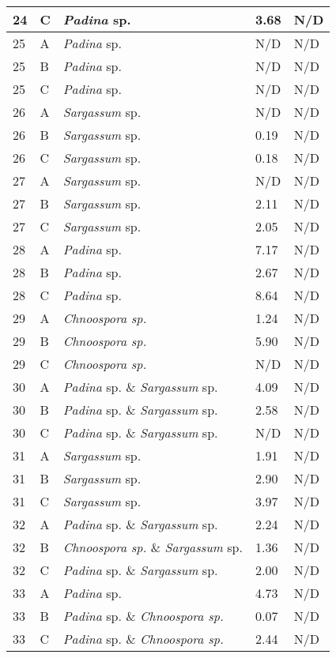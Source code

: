 \documentclass[12pt]{article}
\begin{document}
\begin{longtable}{ | p{1cm} | p{1cm} | p{3cm} | p{4cm} | p{4cm} | }
\hline
24&C&\emph{Padina} sp.&3.68
&N/D\\
\hline
25&A&\emph{Padina} sp.&N/D&N/D\\
\hline
25&B&\emph{Padina} sp.&N/D&N/D\\
\hline
25&C&\emph{Padina} sp.&N/D&N/D\\
\hline
26&A&\emph{Sargassum} sp.&N/D&N/D\\
\hline
26&B&\emph{Sargassum} sp.&0.19
&N/D\\
\hline
26&C&\emph{Sargassum} sp.&0.18
&N/D\\
\hline
27&A&\emph{Sargassum} sp.&N/D&N/D\\
\hline
27&B&\emph{Sargassum} sp.&2.11
&N/D\\
\hline
27&C&\emph{Sargassum} sp.&2.05
&N/D\\
\hline
28&A&\emph{Padina} sp.&7.17
&N/D\\
\hline
28&B&\emph{Padina} sp.&2.67
&N/D\\
\hline
28&C&\emph{Padina} sp.&8.64
&N/D\\
\hline
29&A&\emph{Chnoospora sp.}&1.24
&N/D\\
\hline
29&B&\emph{Chnoospora sp.}&5.90
&N/D\\
\hline
29&C&\emph{Chnoospora sp.}&N/D&N/D\\
\hline
30&A&\emph{Padina} sp. \& \emph{Sargassum} sp.&4.09
&N/D\\
\hline
30&B&\emph{Padina} sp. \& \emph{Sargassum} sp.&2.58
&N/D\\
\hline
30&C&\emph{Padina} sp. \& \emph{Sargassum} sp.&N/D&N/D\\
\hline
31&A&\emph{Sargassum} sp.&1.91
&N/D\\
\hline
31&B&\emph{Sargassum} sp.&2.90
&N/D\\
\hline
31&C&\emph{Sargassum} sp.&3.97
&N/D\\
\hline
32&A&\emph{Padina} sp. \& \emph{Sargassum} sp.&2.24
&N/D\\
\hline
32&B&\emph{Chnoospora sp.} \& \emph{Sargassum} sp.&1.36
&N/D\\
\hline
32&C&\emph{Padina} sp. \& \emph{Sargassum} sp.&2.00
&N/D\\
\hline
33&A&\emph{Padina} sp.&4.73
&N/D\\
\hline
33&B&\emph{Padina} sp. \& \emph{Chnoospora sp.}&0.07
&N/D\\
\hline
33&C&\emph{Padina} sp. \& \emph{Chnoospora sp.}&2.44
&N/D\\
\hline
\end{longtable}
\FloatBarrier
\FloatBarrier
\end{document}

